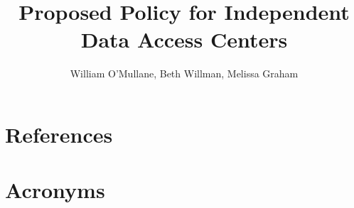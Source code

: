 \documentclass[LPM,lsstdraft]{lsstdoc}
\title[Independent DACs]{Proposed Policy for Independent Data Access Centers}
\author   {William O'Mullane, Beth Willman, Melissa Graham }
\begin{document}
%
%
\maketitle

\renewcommand{\thepage}{\arabic{page}}%

\setcounter{page}{1}%
%
%


\section{References\label{sect:references}}
\renewcommand{\refname}{}


\section{Acronyms}
\end{document}
